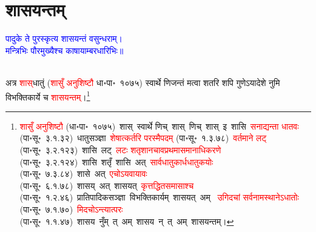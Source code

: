 \section[शासयन्तम्]{शासयन्तम्}
\centering\textcolor{blue}{पादुके ते पुरस्कृत्य शासयन्तं वसुन्धराम्।\nopagebreak\\
मन्त्रिभिः पौरमुख्यैश्च काषायाम्बरधारिभिः॥}\nopagebreak\\
\\
\begin{sloppypar}\justifying\noindent\hspace{10mm} अत्र \textcolor{red}{शास्‌}\-धातुं (\textcolor{red}{शासुँ अनुशिष्टौ} धा॰पा॰~१०७५) स्वार्थे णिजन्तं मत्वा शतरि शपि गुणेऽयादेशे नुमि विभक्तिकार्ये च \textcolor{red}{शासयन्तम्}।\footnote{\textcolor{red}{शासुँ अनुशिष्टौ} (धा॰पा॰~१०७५)~\arrow शास्~\arrow स्वार्थे णिच्~\arrow शास्~णिच्~\arrow शास्~इ~\arrow शासि~\arrow \textcolor{red}{सनाद्यन्ता धातवः} (पा॰सू॰~३.१.३२)~\arrow धातु\-सञ्ज्ञा~\arrow \textcolor{red}{शेषात्कर्तरि परस्मैपदम्} (पा॰सू॰~१.३.७८)~\arrow \textcolor{red}{वर्तमाने लट्} (पा॰सू॰~३.२.१२३)~\arrow शासि~लट्~\arrow \textcolor{red}{लटः शतृशानचावप्रथमा\-समानाधिकरणे} (पा॰सू॰~३.२.१२४)~\arrow शासि~शतृँ~\arrow शासि~अत्~\arrow \textcolor{red}{सार्वधातुकार्ध\-धातुकयोः} (पा॰सू॰~७.३.८४)~\arrow शासे~अत्~\arrow \textcolor{red}{एचोऽयवायावः} (पा॰सू॰~६.१.७८)~\arrow शासय्~अत्~\arrow शासयत्~\arrow \textcolor{red}{कृत्तद्धित\-समासाश्च} (पा॰सू॰~१.२.४६)~\arrow प्रातिपादिक\-सञ्ज्ञा~\arrow विभक्ति\-कार्यम्~\arrow शासयत्~अम्~\arrow \textcolor{red}{ उगिदचां सर्वनामस्थानेऽधातोः} (पा॰सू॰~७.१.७०)~\arrow \textcolor{red}{मिदचोऽन्त्यात्परः} (पा॰सू॰~१.१.४७)~\arrow शासय~नुँम्~त्~अम्~\arrow शासय~न्~त्~अम्~\arrow शासयन्तम्।}\end{sloppypar}

